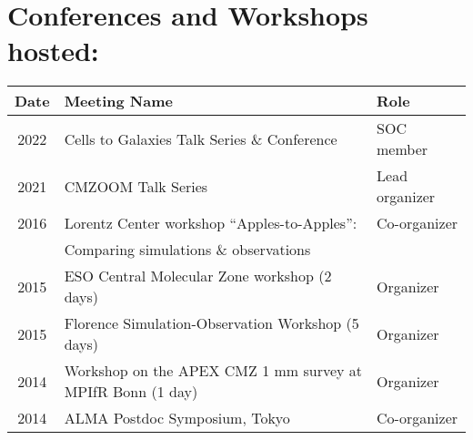 
\begin{minipage}{\textwidth}
\setlength{\extrarowheight}{0pt}
\section*{Conferences and Workshops hosted: }
\vspace{-12pt}
\begin{tabular}{cll}
    Date & Meeting Name & Role  \\
    \hline
    2022 & Cells to Galaxies Talk Series \& Conference  & SOC member \\
    2021 & CMZOOM Talk Series  & Lead organizer \\
    2016 & Lorentz Center workshop ``Apples-to-Apples'':  & Co-organizer \\
         & Comparing simulations \& observations & \\
    2015 &      ESO Central Molecular Zone workshop (2 days)   & Organizer \\
    2015 &      Florence Simulation-Observation Workshop (5 days) & Organizer \\
    2014 &      Workshop on the APEX CMZ 1 mm survey at MPIfR Bonn (1 day)   & Organizer \\
    2014 & ALMA Postdoc Symposium, Tokyo & Co-organizer \\
\end{tabular}
\end{minipage}
\vspace{4mm}
